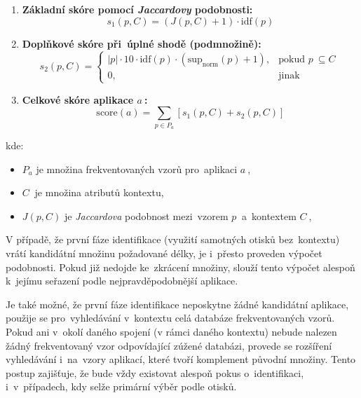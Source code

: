 \begin{enumerate}
	\item \textbf{Základní skóre pomocí \textit{Jaccardovy} podobnosti:}
	      \begin{equation}
	      	s_1(p, C) = \left( J(p, C) + 1 \right) \cdot \mathrm{idf}(p)
	      	\label{eq:s1}
	      \end{equation}
	\item \textbf{Doplňkové skóre při~úplné shodě (podmnožině):}
	      \begin{equation}
	      	s_2(p, C) = 
	      	\begin{cases}
	      		|p| \cdot 10 \cdot \mathrm{idf}(p) \cdot (\mathrm{sup}_\mathrm{norm}(p) + 1), & \text{pokud } p~\subseteq C~\\
	      		0,                                                                            & \text{jinak}                
	      	\end{cases}
	      	\label{eq:s2}
	      \end{equation}
	\item \textbf{Celkové skóre aplikace \( a~\):}
	      \begin{equation}
	      	\mathrm{score}(a) = \sum_{p \in P_a} \left[ s_1(p, C) + s_2(p, C) \right]
	      	\label{eq:score}
	      \end{equation}
\end{enumerate}

\noindent
kde:
\begin{itemize}
	\item \( P_a \) je množina frekventovaných vzorů pro~aplikaci \( a~\),
	\item \( C~\) je množina atributů kontextu,
	\item \( J(p, C) \) je \textit{Jaccardova} podobnost mezi~vzorem \( p~\) a~kontextem \( C~\),
\end{itemize}

V případě, že první fáze identifikace (využití samotných otisků bez~kontextu) vrátí kandidátní množinu požadované délky, je i~přesto proveden výpočet podobnosti. Pokud již nedojde ke~zkrácení množiny, slouží tento výpočet alespoň k~jejímu seřazení podle nejpravděpodobnější aplikace.

Je také možné, že první fáze identifikace neposkytne žádné kandidátní aplikace, použije se pro~vyhledávání v~kontextu celá databáze frekventovaných vzorů. Pokud ani v~okolí daného spojení (v rámci daného kontextu) nebude nalezen žádný frekventovaný vzor odpovídající zúžené databázi, provede se rozšíření vyhledávání i~na~vzory aplikací, které tvoří komplement původní množiny. Tento postup zajišťuje, že bude vždy existovat alespoň pokus o~identifikaci, i~v~případech, kdy selže primární výběr podle otisků.

